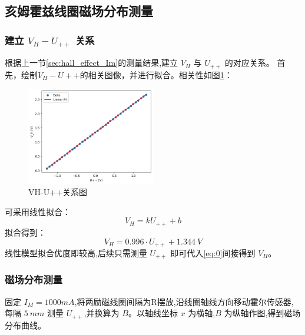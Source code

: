 \documentclass[UTF8]{ctexart}
\begin{document}
    \subsection{亥姆霍兹线圈磁场分布测量}
    \subsubsection{建立 $V_H-U_{++}$ 关系}
    根据上一节\ref{sec:hall_effect_Im}的测量结果,建立 $V_H$ 与 $U_{++}$ 的对应关系。
    首先，绘制$V_H-U++$的相关图像，并进行拟合。相关性如图\ref{fig:VH-U++}：
    \begin{figure}[htbp]
        \centering
        \includegraphics[width=0.5\textwidth]{VH-U++.png}
        \caption{VH-U++关系图}
        \label{fig:VH-U++}
    \end{figure}
    可采用线性拟合：
    \begin{equation}
    V_H = k U_{++} + b    
    \end{equation}
    拟合得到：
    \begin{equation}
        \label{eq:0}
        V_H = 0.996 \cdot U_{++} + \SI{1.344}{V}
    \end{equation}
    线性模型拟合优度即较高,后续只需测量 $U_{++}$ 即可代入\ref{eq:0}间接得到 $V_H$。
    
    \subsubsection{磁场分布测量} \label{sec:measure}
    固定 $I_M=1000mA$,将两励磁线圈间隔为R摆放,沿线圈轴线方向移动霍尔传感器,每隔 $\SI{5}{mm}$ 测量 $U_{++}$,并换算为 $B$。以轴线坐标 $x$ 为横轴,$B$ 为纵轴作图,得到磁场分布曲线。
    
\end{document}
